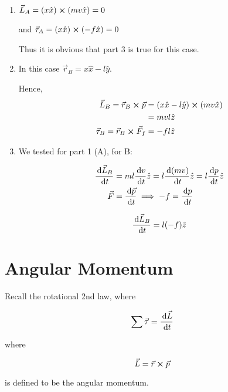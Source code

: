 \begin{sol}
	\begin{enumerate}
		\item $\vec L_A = (x \hat x) \cross (mv \hat x) = 0$
		
		and $\vec \tau_A = (x \hat x) \cross (- f \hat x) = 0$

		Thus it is obvious that part 3 is true for this case.

		\item In this case $\vec r_B = x \hat x - l \hat y$.

		Hence, 
		\begin{align}
			\vec L_B = \vec r_B \cross \vec p &= (x \hat x - l \hat y) \cross (mv \hat x)\\
			&= mvl\hat z\\
			\vec \tau_B = \vec r_B \cross \vec F_f &= - fl \hat z
		\end{align}

		\item We tested for part 1 (A), for B:
		
		\begin{align}
			\frac{\D \vec L_B}{\D t} &= ml \frac{\D v}{\D t} \hat z = l \frac{\D (mv)}{\D t} \hat z = l \frac{\D p}{\D t} \hat z\\
			\vec F &= \frac{\D \vec p}{\D t} \implies - f = \frac{\D p}{\D t}
		\end{align}

		\begin{equation}
			\frac{\D \vec L_B}{\D t} = l (-f) \hat z
		\end{equation}
	\end{enumerate}
\end{sol}

\section{Angular Momentum}

Recall the rotational 2nd law, where

\begin{equation}
	\sum \vec \tau = \frac{\D \vec L}{\D t}
\end{equation}

where

\begin{definition}
	\begin{equation}
		\vec L = \vec r \cross \vec p
	\end{equation}

	is defined to be the angular momentum.
\end{definition}

